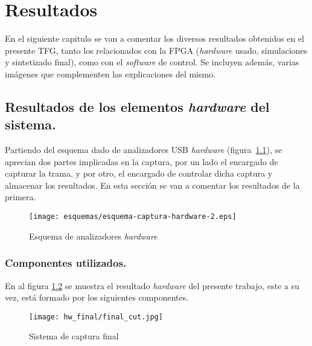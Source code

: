 \chapter{Resultados}
\label{ch:resultados}

En el siguiente capitulo se van a comentar los diversos resultados obtenidos en el presente TFG, tanto los relacionados con la FPGA (\emph{hardware} usado, simulaciones y sintetizado final), como con el \emph{software} de control. Se incluyen además, varias imágenes que complementen las explicaciones del mismo.


\section{Resultados de los elementos \emph{hardware} del sistema.}
Partiendo del esquema dado de analizadores USB \emph{hardware} (figura~\ref{fig:esquema-hardware}), se aprecian dos partes implicadas en la captura, por un lado el encargado de capturar la trama, y por otro, el encargado de controlar dicha captura y almacenar los resultados. En esta sección se van a comentar los resultados de la primera.

\begin{figure}[htb]
    \centering
    \texttt{[image: esquemas/esquema-captura-hardware-2.eps]}
    \caption{Esquema de analizadores \emph{hardware}}
    \label{fig:esquema-hardware}
\end{figure}

\subsection{Componentes utilizados.}
En al figura \ref{fig:sistema_final} se muestra el resultado \emph{hardware} del presente trabajo, este a su vez, está formado por los siguientes componentes.

\begin{figure}[htbp]
    \centering
    \texttt{[image: hw\_final/final\_cut.jpg]}
    \caption{Sistema de captura final}
    \label{fig:sistema_final}
\end{figure}

